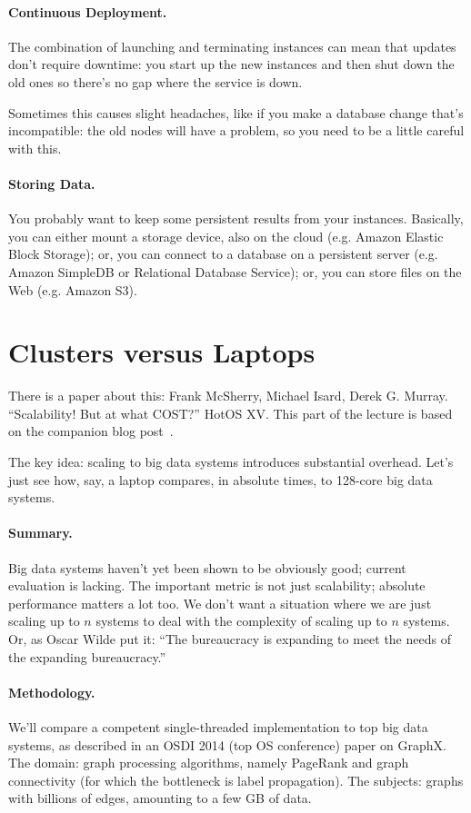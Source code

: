 \paragraph{Continuous Deployment.} The combination of launching and terminating instances can mean that updates don't require downtime: you start up the new instances and then shut down the old ones so there's no gap where the service is down.

Sometimes this causes slight headaches, like if you make a database change that's incompatible: the old nodes will have a problem, so you need to be a little careful with this.

\paragraph{Storing Data.} You probably want to keep some persistent results
from your instances. Basically, you can either mount a storage device,
also on the cloud (e.g. Amazon Elastic Block Storage); or, you can
connect to a database on a persistent server (e.g. Amazon SimpleDB or
Relational Database Service); or, you can store files on the Web
(e.g. Amazon S3). 


\section*{Clusters versus Laptops}
There is a paper about this: Frank McSherry, Michael Isard, Derek G. Murray. ``Scalability! But at what COST?'' HotOS XV. This part of the lecture is based on the companion blog post~\cite{scalecost}.

The key idea: scaling to big data systems introduces substantial overhead. Let's just see how, say, a laptop compares, in absolute times, to 128-core big data systems.

\paragraph{Summary.} Big data systems haven't yet been shown to be obviously good; current evaluation is lacking.
The important metric is not just scalability; absolute
performance matters a lot too. We don't want a situation where we are just scaling up to $n$ systems to deal with the complexity of scaling up to $n$ systems. Or, as Oscar Wilde put it: ``The bureaucracy is expanding to meet the needs of the expanding bureaucracy.''

\paragraph{Methodology.} We'll compare a competent single-threaded implementation to top
big data systems, as described in an OSDI 2014 (top OS conference) paper on GraphX\cite{graphx}. The domain: graph processing
algorithms, namely PageRank and graph connectivity (for which the bottleneck is label propagation). The subjects: graphs with billions of edges, amounting to a few
GB of data.

